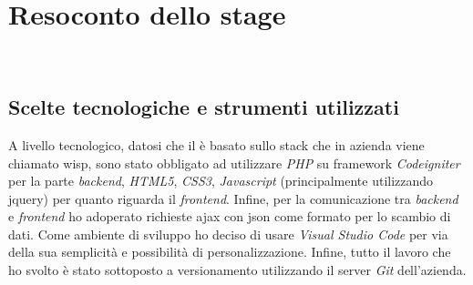 
\chapter{Resoconto dello stage}
\label{cap:resoconto-stage}

\\


\section{Scelte tecnologiche e strumenti utilizzati}
A livello tecnologico, datosi che il \bookingEngine\hphantom{i}è basato sullo stack che in azienda viene chiamato \gls{wisp}, sono stato obbligato ad utilizzare \textit{PHP} su \gls{framework} \textit{Codeigniter} per la parte \textit{backend}, \textit{HTML5}, \textit{CSS3}, \textit{Javascript} (principalmente utilizzando \gls{jquery}) per quanto riguarda il \textit{frontend}. Infine, per la comunicazione tra \textit{backend} e \textit{frontend} ho adoperato richieste \gls{ajax} con \gls{json} come formato per lo scambio di dati. Come ambiente di sviluppo ho deciso di usare \textit{Visual Studio Code} per via della sua semplicità e possibilità di personalizzazione. Infine, tutto il lavoro che ho svolto è stato sottoposto a versionamento utilizzando il server \textit{Git} dell'azienda. 

